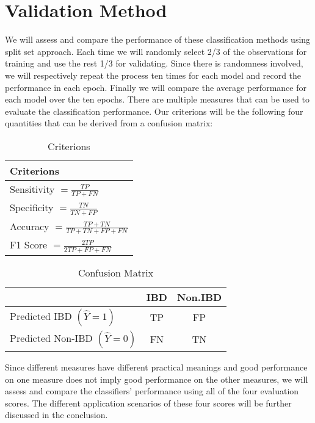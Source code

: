 \documentclass[preprint, 3p,
authoryear]{elsarticle} %
\begin{document}
\hypertarget{validation-method}{%
\section{Validation Method}\label{validation-method}}

We will assess and compare the performance of these classification
methods using split set approach. Each time we will randomly select 2/3
of the observations for training and use the rest 1/3 for validating.
Since there is randomness involved, we will respectively repeat the
process ten times for each model and record the performance in each
epoch. Finally we will compare the average performance for each model
over the ten epochs. There are multiple measures that can be used to
evaluate the classification performance. Our criterions will be the
following four quantities that can be derived from a confusion matrix:

\begin{table}[H]

\caption{\label{tab:unnamed-chunk-2}Criterions}
\centering
\begin{tabular}[t]{l}
\hline
Criterions\\
\hline
Sensitivity $=\frac{TP}{TP+FN}$\\
\addlinespace
Specificity $=\frac{TN}{TN+FP}$\\
\addlinespace
Accuracy $=\frac{TP+TN}{TP+TN+FP+FN}$\\
\addlinespace
F1 Score $=\frac{2TP}{2TP+FP+FN}$\\
\hline
\end{tabular}
\end{table}

\begin{table}[H]

\caption{\label{tab:unnamed-chunk-3}Confusion Matrix}
\centering
\begin{tabular}[t]{lcc}
\toprule
  & IBD & Non.IBD\\
\midrule
Predicted IBD $(\hat{Y}=1)$ & TP & FP\\
Predicted Non-IBD $(\hat{Y}=0)$ & FN & TN\\
\bottomrule
\end{tabular}
\end{table}

Since different measures have different practical meanings and good
performance on one measure does not imply good performance on the other
measures, we will assess and compare the classifiers' performance using
all of the four evaluation scores. The different application scenarios
of these four scores will be further discussed in the conclusion.
\end{document}

